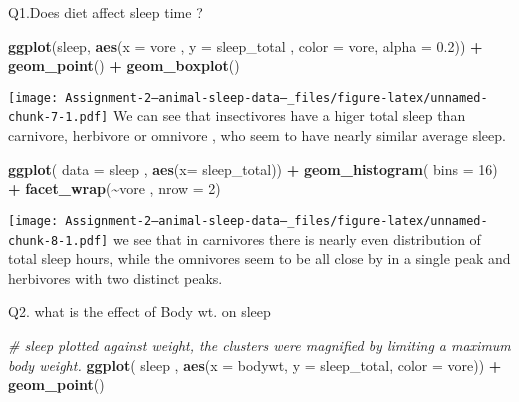 \documentclass[
]{article}
\newenvironment{Shaded}{\begin{snugshade}}{\end{snugshade}}
\newcommand{\AttributeTok}[1]{\textcolor[rgb]{0.13,0.29,0.53}{#1}}
\newcommand{\CommentTok}[1]{\textcolor[rgb]{0.56,0.35,0.01}{\textit{#1}}}
\newcommand{\DecValTok}[1]{\textcolor[rgb]{0.00,0.00,0.81}{#1}}
\newcommand{\FloatTok}[1]{\textcolor[rgb]{0.00,0.00,0.81}{#1}}
\newcommand{\FunctionTok}[1]{\textcolor[rgb]{0.13,0.29,0.53}{\textbf{#1}}}
\newcommand{\NormalTok}[1]{#1}
\newcommand{\SpecialCharTok}[1]{\textcolor[rgb]{0.81,0.36,0.00}{\textbf{#1}}}
\begin{document}
Q1.Does diet affect sleep time ?

\begin{Shaded}
\begin{Highlighting}[]
\FunctionTok{ggplot}\NormalTok{(sleep, }\FunctionTok{aes}\NormalTok{(}\AttributeTok{x =}\NormalTok{ vore , }\AttributeTok{y =}\NormalTok{ sleep\_total , }\AttributeTok{color =}\NormalTok{ vore, }\AttributeTok{alpha =} \FloatTok{0.2}\NormalTok{)) }\SpecialCharTok{+} \FunctionTok{geom\_point}\NormalTok{() }\SpecialCharTok{+} \FunctionTok{geom\_boxplot}\NormalTok{()}
\end{Highlighting}
\end{Shaded}

\texttt{[image: Assignment-2---animal-sleep-data--\_files/figure-latex/unnamed-chunk-7-1.pdf]}
We can see that insectivores have a higer total sleep than carnivore,
herbivore or omnivore , who seem to have nearly similar average sleep.

\begin{Shaded}
\begin{Highlighting}[]
\FunctionTok{ggplot}\NormalTok{( }\AttributeTok{data =}\NormalTok{ sleep , }\FunctionTok{aes}\NormalTok{(}\AttributeTok{x=}\NormalTok{ sleep\_total))  }\SpecialCharTok{+} \FunctionTok{geom\_histogram}\NormalTok{( }\AttributeTok{bins =} \DecValTok{16}\NormalTok{) }\SpecialCharTok{+} \FunctionTok{facet\_wrap}\NormalTok{(}\SpecialCharTok{\textasciitilde{}}\NormalTok{vore , }\AttributeTok{nrow =} \DecValTok{2}\NormalTok{)}
\end{Highlighting}
\end{Shaded}

\texttt{[image: Assignment-2---animal-sleep-data--\_files/figure-latex/unnamed-chunk-8-1.pdf]}
we see that in carnivores there is nearly even distribution of total
sleep hours, while the omnivores seem to be all close by in a single
peak and herbivores with two distinct peaks.

Q2. what is the effect of Body wt. on sleep

\begin{Shaded}
\begin{Highlighting}[]
\CommentTok{\# sleep plotted against weight, the clusters were magnified by limiting a maximum body weight.}
\FunctionTok{ggplot}\NormalTok{( sleep , }\FunctionTok{aes}\NormalTok{(}\AttributeTok{x =}\NormalTok{ bodywt, }\AttributeTok{y =}\NormalTok{ sleep\_total, }\AttributeTok{color =}\NormalTok{ vore)) }\SpecialCharTok{+} \FunctionTok{geom\_point}\NormalTok{()}
\end{Highlighting}
\end{Shaded}
\end{document}
